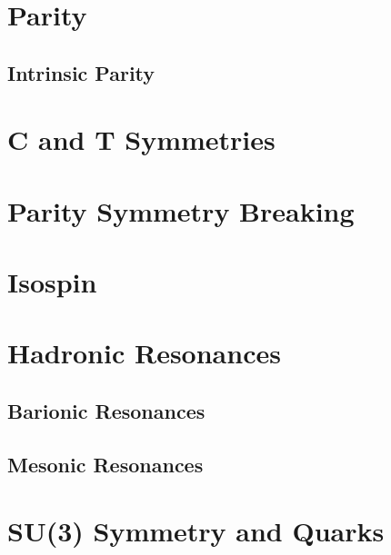 \documentclass[../qm.tex]{subfiles}
\begin{document}
\section{Parity}
\subsection{Intrinsic Parity}
\section{C and T Symmetries}
\section{Parity Symmetry Breaking}
\section{Isospin}
\section{Hadronic Resonances}
\subsection{Barionic Resonances}
\subsection{Mesonic Resonances}
\section{SU(3) Symmetry and Quarks}
\end{document}
